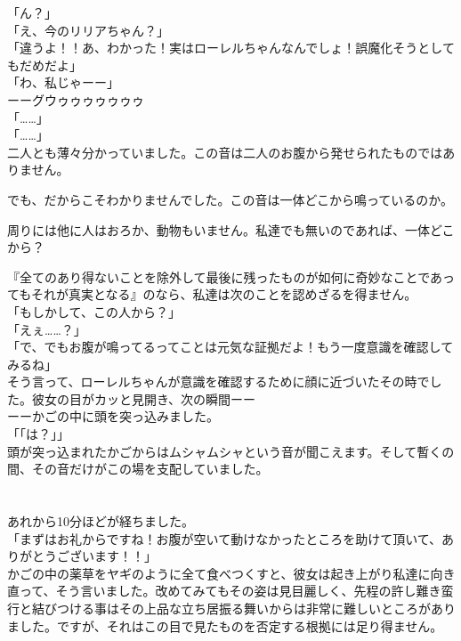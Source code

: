 \documentclass[oneside, a4paper]{jsbook}
\begin{document}
\noindent
「ん？」\\
「え、今のリリアちゃん？」\\
「違うよ！！あ、わかった！実はローレルちゃんなんでしょ！誤魔化そうとしてもだめだよ」\\
「わ、私じゃーー」\\

ーーグウゥゥゥゥゥゥゥ\\

\noindent
「……」\\
「……」\\

二人とも薄々分かっていました。この音は二人のお腹から発せられたものではありません。

でも、だからこそわかりませんでした。この音は一体どこから鳴っているのか。

周りには他に人はおろか、動物もいません。私達でも無いのであれば、一体どこから？

『全てのあり得ないことを除外して最後に残ったものが如何に奇妙なことであってもそれが真実となる』のなら、私達は次のことを認めざるを得ません。\\

\noindent
「もしかして、この人から？」\\
「えぇ……？」\\
「で、でもお腹が鳴ってるってことは元気な証拠だよ！もう一度意識を確認してみるね」\\

そう言って、ローレルちゃんが意識を確認するために顔に近づいたその時でした。彼女の目がカッと見開き、次の瞬間ーー\\

ーーかごの中に頭を突っ込みました。\\

\noindent
「「は？」」\\

頭が突っ込まれたかごからはムシャムシャという音が聞こえます。そして暫くの間、その音だけがこの場を支配していました。\\\\\\

あれから10分ほどが経ちました。\\

\noindent
「まずはお礼からですね！お腹が空いて動けなかったところを助けて頂いて、ありがとうございます！！」\\

かごの中の薬草をヤギのように全て食べつくすと、彼女は起き上がり私達に向き直って、そう言いました。改めてみてもその姿は見目麗しく、先程の許し難き蛮行と結びつける事はその上品な立ち居振る舞いからは非常に難しいところがありました。ですが、それはこの目で見たものを否定する根拠には足り得ません。\\
\end{document}
